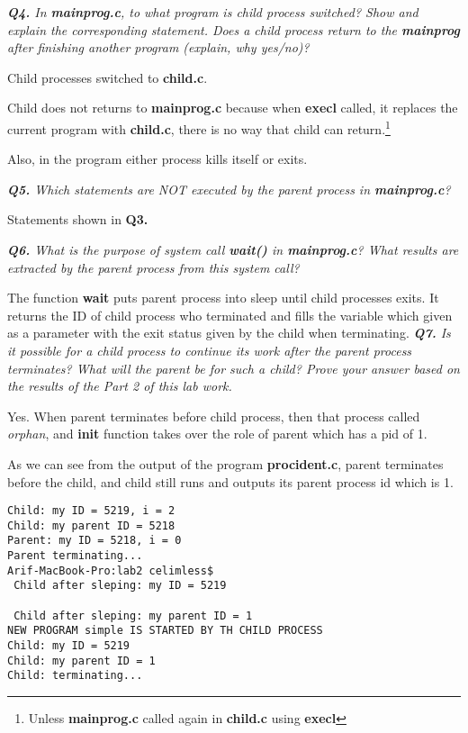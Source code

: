 \documentclass[11pt]{article}
\begin{document}
\vspace{5mm}
\textit{\textbf{Q4.} In \textbf{mainprog.c}, to what program is child process switched? Show and explain the corresponding statement. Does a child process return to the \textbf{mainprog} after finishing another program (explain, why yes/no)?}
\vspace{5mm}

Child processes switched to \textbf{child.c}.

Child does not returns to \textbf{mainprog.c} because when \textbf{execl} called, it replaces the current program with \textbf{child.c}, there is no way that child can return.\footnote{Unless \textbf{mainprog.c} called again in \textbf{child.c} using \textbf{execl}}

Also, in the program either process kills itself or exits.

\vspace{5mm}
\textit{\textbf{Q5.} Which statements are NOT executed by the parent process in \textbf{mainprog.c}?}
\vspace{5mm}

Statements shown in \textbf{Q3.}

\vspace{5mm}
\textit{\textbf{Q6.} What is the purpose of system call \textbf{wait()} in \textbf{mainprog.c}? What results are extracted by the parent process from this system call?}
\vspace{5mm}

The function \textbf{wait} puts parent process into sleep until child processes exits. It returns the ID of child process who terminated and fills the variable which given as a parameter with the exit status given by the child when terminating.
\newpage
\vspace{5mm}
\textit{\textbf{Q7.} Is it possible for a child process to continue its work after the parent process terminates? What will the parent be for such a child? Prove your answer based on the results of the Part 2 of this lab work.}
\vspace{5mm}

Yes. When parent terminates before child process, then that process called \textit{orphan}, and \textbf{init} function takes over the role of parent which has a pid of 1.

As we can see from the output of the program \textbf{procident.c}, parent terminates before the child, and child still runs and outputs its parent process id which is 1.

\begin{lstlisting}[frame=tlrb]
Child: my ID = 5219, i = 2
Child: my parent ID = 5218
Parent: my ID = 5218, i = 0
Parent terminating...
Arif-MacBook-Pro:lab2 celimless$ 
 Child after sleping: my ID = 5219

 Child after sleping: my parent ID = 1
NEW PROGRAM simple IS STARTED BY TH CHILD PROCESS
Child: my ID = 5219
Child: my parent ID = 1
Child: terminating...
\end{lstlisting}
\end{document}
